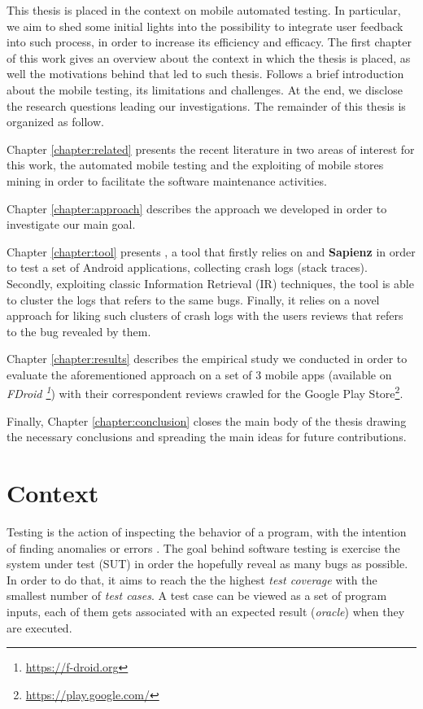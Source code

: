 \label{chapter:intro}
This thesis is placed in the context on mobile automated testing. In particular, we aim to shed some initial lights into the possibility to integrate user feedback into such process, in order to increase its efficiency and efficacy.
The first chapter of this work gives an overview about the context in which the thesis is placed, as well the motivations behind that led to such thesis. Follows a brief introduction about the mobile testing, its limitations and challenges. At the end, we disclose the research questions leading our investigations. 
The remainder of this thesis is organized as follow. 

Chapter \ref{chapter:related} presents the recent literature in two areas of interest for this work, \ie the automated mobile testing and the exploiting of mobile stores mining in order to facilitate the software maintenance activities.

Chapter \ref{chapter:approach} describes the approach we developed in order to investigate our main goal.

Chapter \ref{chapter:tool} presents \toolname, a tool that firstly relies on \monkey and \textbf{Sapienz} in order to test a set of Android applications, collecting crash logs (\ie stack traces). Secondly, exploiting classic Information Retrieval (IR) techniques, the tool is able to cluster the logs that refers to the same bugs. Finally, it relies on a novel approach for liking such clusters of crash logs with the users reviews that refers to the bug revealed by them. 

Chapter \ref{chapter:results} describes the empirical study we conducted in order to evaluate the aforementioned approach on a set of 3 mobile apps (available on \textit{FDroid \footnote{\url{https://f-droid.org}}}) with their correspondent reviews crawled for the Google Play Store\footnote{\url{https://play.google.com/}}. 

Finally, Chapter \ref{chapter:conclusion} closes the main body of the thesis drawing the necessary conclusions and spreading the main ideas for future contributions.


\section{Context}
Testing is the action of inspecting the behavior of a program, with the intention of finding anomalies or errors \cite{testing}.
The goal behind software testing is exercise the system under test (SUT) in order the hopefully reveal as many bugs as possible. In order to do that, it aims to reach the the highest \textit{test coverage} with the smallest number of \textit{test cases}. A test case can be viewed as a set of program inputs, each of them gets associated with an expected result (\ie \textit{oracle}) when they are executed. 

